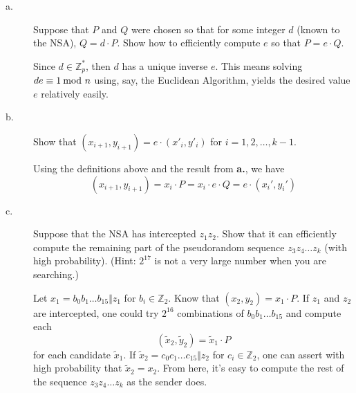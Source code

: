 \documentclass[../hw_sols.tex]{subfiles}
\begin{document}
\begin{description}

\item[a.] Suppose that $P$ and $Q$ were chosen so that for some integer $d$ 
(known to the NSA), $Q = d \cdot P$. Show how to efficiently compute $e$ so 
that $P = e \cdot Q$.

\begin{solution}
Since $d \in \mathbb{Z}_p^*$, then $d$ has a unique inverse $e$. This means 
solving $de \equiv 1 \tmod{n}$ using, say, the Euclidean Algorithm, yields 
the desired value $e$ relatively easily.
\end{solution}
	
\item[b.] Show that $(x_{i+1}, y_{i+1}) = e \cdot (x'_i, y'_i)$ for 
$i = 1, 2, \dots, k-1$.

\begin{solution}
Using the definitions above and the result from \textbf{a.}, we have
	\[ (x_{i+1}, y_{i+1}) 
	= x_i \cdot P 
	= x_i \cdot e \cdot Q 
	= e \cdot (x_i', y_i') \]
\end{solution}
	
\item[c.] Suppose that the NSA has intercepted $z_1 z_2$. Show that it 
can efficiently compute the remaining part of the \newline 
pseudorandom sequence $z_3 z_4 \dots z_k$ (with high probability). 
(Hint: $2^{17}$ is not a very large number when you are searching.)

\begin{solution}
Let $x_1 = b_0 b_1 \dots b_{15} \Vert z_1$ for $b_i \in \mathbb{Z}_2$. Know 
that $(x_2, y_2) = x_1 \cdot P$. If $z_1$ and $z_2$ are intercepted, one 
could try $2^{16}$ combinations of $b_0 b_1 \dots b_{15}$ and compute each 
	\[ (\tilde{x}_2, \tilde{y}_2) = \tilde{x}_1 \cdot P \]
for each candidate $\tilde{x}_1$. If 
$\tilde{x}_2 = c_0 c_1 \dots c_{15} \Vert z_2$ for $c_i \in \mathbb{Z}_2$, 
one can assert with high probability that $\tilde{x}_2 = x_2$. From here, 
it's easy to compute the rest of the sequence $z_3 z_4 \dots z_k$ as the 
sender does.
\end{solution}

\end{description}
\end{document}
